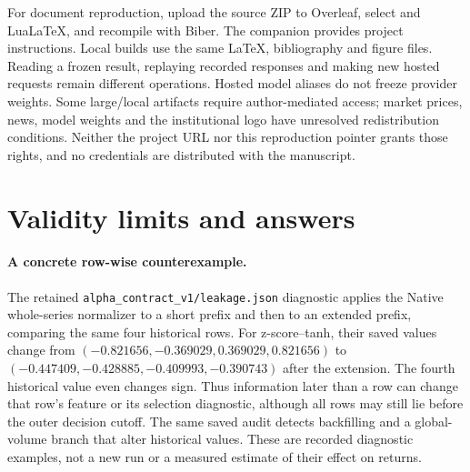 For document reproduction, upload the source ZIP to Overleaf, select
 and LuaLaTeX, and recompile with Biber. The companion
 provides project instructions. Local builds use the same
LaTeX, bibliography and figure files. Reading a frozen result,
replaying recorded responses and making new hosted requests remain
different operations. Hosted model aliases do not freeze provider
weights. Some large/local artifacts require author-mediated access;
market prices, news, model weights and the institutional logo have
unresolved redistribution conditions. Neither the project URL nor this
reproduction pointer grants those rights, and no credentials are
distributed with the manuscript.

\section{Validity limits and answers}\label{s:7abb5e08a08c44da}
\begingroup\raggedright
\paragraph{A concrete row-wise counterexample.}
The retained \texttt{alpha\_contract\_v1/leakage.json} diagnostic applies
the Native whole-series normalizer to a short prefix and then to an
extended prefix, comparing the same four historical rows. For
z-score--tanh, their saved values change from
$(-0.821656,-0.369029,0.369029,0.821656)$ to
$(-0.447409,-0.428885,-0.409993,-0.390743)$ after the extension.
The fourth historical value even changes sign. Thus information later
than a row can change that row's feature or its selection diagnostic,
although all rows may still lie before the outer decision cutoff.
The same saved audit detects backfilling and a global-volume branch
that alter historical values. These are recorded diagnostic examples,
not a new run or a measured estimate of their effect on returns.\par
\endgroup

